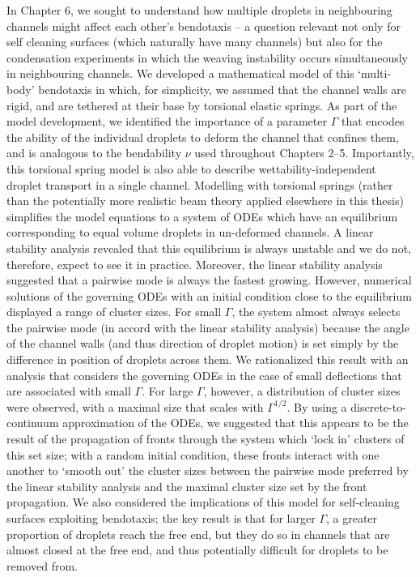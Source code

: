 In Chapter 6, we sought to understand how multiple droplets in neighbouring channels might affect each other's bendotaxis -- a question relevant not only for self cleaning surfaces (which naturally have many channels) but also for the condensation experiments in which the weaving instability occurs simultaneously in neighbouring channels. We developed a mathematical model of this `multi-body’ bendotaxis in which, for simplicity, we assumed that the channel walls are rigid, and are tethered at their base by torsional elastic springs. As part of the model development, we identified the importance of a parameter $\Gamma$  that encodes the ability of the individual droplets to deform the channel that confines them, and is analogous to the bendability $\nu$ used throughout Chapters 2--5. Importantly, this torsional spring model is also able to describe wettability-independent droplet transport in a single channel. Modelling with torsional springs (rather than the potentially more realistic beam theory applied elsewhere in this thesis) simplifies the model equations to a system of ODEs which have an equilibrium corresponding to equal volume droplets in un-deformed channels. A linear stability analysis revealed that this equilibrium is always unstable and we do not, therefore, expect to see it in practice. Moreover, the linear stability analysis suggested that a pairwise mode is always the fastest growing. However, numerical solutions of the governing ODEs with an initial condition close to the equilibrium displayed a range of cluster sizes. For small $\Gamma$, the system almost always selects the pairwise mode (in accord with the linear stability analysis) because the angle of the channel walls (and thus direction of droplet motion) is set simply by the difference in position of droplets across them. We rationalized this result with an analysis that considers the governing ODEs in the case of small deflections that are associated with small $\Gamma$. For large $\Gamma$, however, a distribution of cluster sizes were observed, with a maximal size that scales with $\Gamma^{1/2}$. By using a discrete-to-continuum approximation of the ODEs, we suggested that this appears to be the result of the propagation of fronts through the system which `lock in' clusters of this set size; with a random initial condition, these fronts interact with one another to `smooth out' the cluster sizes between the pairwise mode preferred by the linear stability analysis and the maximal cluster size set by the front propagation. We also considered the implications of this model for self-cleaning surfaces exploiting bendotaxis; the key result is that for larger $\Gamma$, a greater proportion of droplets reach the free end, but they do so in channels that are almost closed at the free end, and thus potentially difficult for droplets to be removed from.



